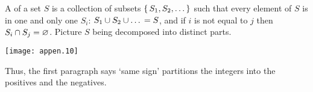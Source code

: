 A  
of a set \( S \) is a collection of subsets
\( \mbox{$\{\,S_1,S_2,\ldots\,\}$} \) such that
every element of \( S \) is in one and only one \( S_i \):
\( S_1\cup S_2\cup \ldots{} = S \), and
if \( i \) is not equal to \( j \) then
\( S_i\cap S_j=\varnothing \).
Picture \( S \) being decomposed into distinct parts.
\begin{center}
  \texttt{[image: appen.10]}
%
%
%
%
\end{center}
Thus, the first paragraph says `same sign' partitions
the integers into the positives and the negatives.
%
%
%
